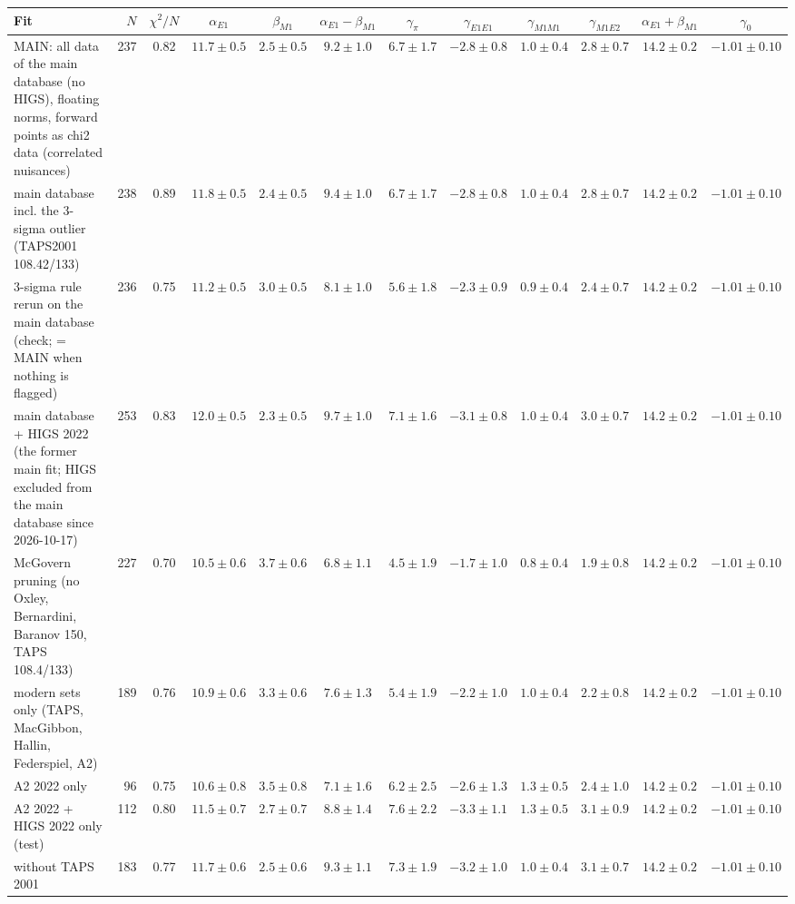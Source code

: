 \begin{tabular}{l r c cccc ccc cc}
\hline
Fit & $N$ & $\chi^2/N$ & $\alpha_{E1}$ & $\beta_{M1}$ & $\alpha_{E1}-\beta_{M1}$ & $\gamma_\pi$ & $\gamma_{E1E1}$ & $\gamma_{M1M1}$ & $\gamma_{M1E2}$ & $\alpha_{E1}+\beta_{M1}$ & $\gamma_0$\\\hline
MAIN: all data of the main database (no HIGS), floating norms, forward points as chi2 data (correlated nuisances) & 237 & 0.82 & $11.7\pm0.5$ & $2.5\pm0.5$ & $9.2\pm1.0$ & $6.7\pm1.7$ & $-2.8\pm0.8$ & $1.0\pm0.4$ & $2.8\pm0.7$ & $14.2\pm0.2$ & $-1.01\pm0.10$\\
main database incl. the 3-sigma outlier (TAPS2001 108.42/133) & 238 & 0.89 & $11.8\pm0.5$ & $2.4\pm0.5$ & $9.4\pm1.0$ & $6.7\pm1.7$ & $-2.8\pm0.8$ & $1.0\pm0.4$ & $2.8\pm0.7$ & $14.2\pm0.2$ & $-1.01\pm0.10$\\
3-sigma rule rerun on the main database (check; = MAIN when nothing is flagged) & 236 & 0.75 & $11.2\pm0.5$ & $3.0\pm0.5$ & $8.1\pm1.0$ & $5.6\pm1.8$ & $-2.3\pm0.9$ & $0.9\pm0.4$ & $2.4\pm0.7$ & $14.2\pm0.2$ & $-1.01\pm0.10$\\
main database + HIGS 2022 (the former main fit; HIGS excluded from the main database since 2026-10-17) & 253 & 0.83 & $12.0\pm0.5$ & $2.3\pm0.5$ & $9.7\pm1.0$ & $7.1\pm1.6$ & $-3.1\pm0.8$ & $1.0\pm0.4$ & $3.0\pm0.7$ & $14.2\pm0.2$ & $-1.01\pm0.10$\\
McGovern pruning (no Oxley, Bernardini, Baranov 150, TAPS 108.4/133) & 227 & 0.70 & $10.5\pm0.6$ & $3.7\pm0.6$ & $6.8\pm1.1$ & $4.5\pm1.9$ & $-1.7\pm1.0$ & $0.8\pm0.4$ & $1.9\pm0.8$ & $14.2\pm0.2$ & $-1.01\pm0.10$\\
modern sets only (TAPS, MacGibbon, Hallin, Federspiel, A2) & 189 & 0.76 & $10.9\pm0.6$ & $3.3\pm0.6$ & $7.6\pm1.3$ & $5.4\pm1.9$ & $-2.2\pm1.0$ & $1.0\pm0.4$ & $2.2\pm0.8$ & $14.2\pm0.2$ & $-1.01\pm0.10$\\
A2 2022 only & 96 & 0.75 & $10.6\pm0.8$ & $3.5\pm0.8$ & $7.1\pm1.6$ & $6.2\pm2.5$ & $-2.6\pm1.3$ & $1.3\pm0.5$ & $2.4\pm1.0$ & $14.2\pm0.2$ & $-1.01\pm0.10$\\
A2 2022 + HIGS 2022 only (test) & 112 & 0.80 & $11.5\pm0.7$ & $2.7\pm0.7$ & $8.8\pm1.4$ & $7.6\pm2.2$ & $-3.3\pm1.1$ & $1.3\pm0.5$ & $3.1\pm0.9$ & $14.2\pm0.2$ & $-1.01\pm0.10$\\
without TAPS 2001 & 183 & 0.77 & $11.7\pm0.6$ & $2.5\pm0.6$ & $9.3\pm1.1$ & $7.3\pm1.9$ & $-3.2\pm1.0$ & $1.0\pm0.4$ & $3.1\pm0.7$ & $14.2\pm0.2$ & $-1.01\pm0.10$\\

\end{tabular}
